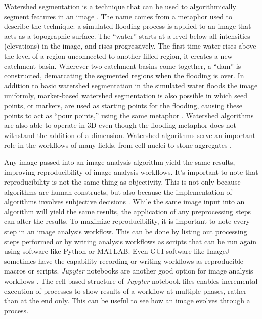 Watershed segmentation is a technique that can be used to algorithmically
segment features in an image \cite{Beucher1979, Soille1990viscomm,
Soille1990sigproc, Vincent1991}. The name comes from a metaphor used to
describe the technique: a simulated flooding process is applied to an
image that acts as a topographic surface. The ``water'' starts at a level
below all intensities (elevations) in the image, and rises progressively.
The first time water rises above the level of a region unconnected to
another filled region, it creates a new catchment basin. Wherever two
catchment basins come together, a ``dam'' is constructed, demarcating the
segmented regions when the flooding is over. In addition to basic
watershed segmentation in the simulated water floods the image uniformly,
marker-based watershed segmentation is also possible in which seed points,
or markers, are used as starting points for the flooding, causing these
points to act as ``pour points,'' using the same metaphor \cite{Moga1998,
Parvati2008}. Watershed algorithms are also able to operate in 3D even
though the flooding metaphor does not withstand the addition of a
dimension. Watershed algorithms serve an important role in the workflows
of many fields, from cell nuclei \cite{Wahlby2004, Cheng2009} to stone
aggregates \cite{Kim2003, Burgmann2022}.

Any image passed into an image analysis algorithm yield the same results,
improving reproducibility of image analysis workflows. It's important to
note that reproducibility is not the same thing as objectivity. This is
not only because algorithms are human constructs, but also because the
implementation of algorithms involves subjective decisions
\cite{Tadrous2010}. While the same image input into an algorithm will
yield the same results, the application of any preprocessing steps can
alter the results. To maximize reproducibility, it is important to note
every step in an image analysis workflow. This can be done by listing out
processing steps performed or by writing analysis workflows as scripts
that can be run again using software like Python or MATLAB. Even GUI
software like ImageJ sometimes have the capability recording or writing
workflows as reproducible macros or scripts. \textit{Jupyter} notebooks
are another good option for image analysis workflows \cite{jupyter}.
The cell-based
structure of \textit{Jupyter} notebook files enables incremental execution of
processes to show results of a workflow at multiple phases, rather than at
the end only. This can be useful to see how an image evolves through a
process.

